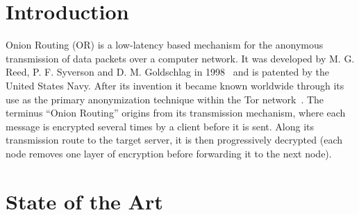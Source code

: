 \documentclass{sig-alternate}
\begin{document}


\section{Introduction}
Onion Routing (OR) is a low-latency based mechanism for the anonymous transmission of data packets over a computer network. It was developed by M. G. Reed, P. F. Syverson and D. M. Goldschlag in 1998~\cite{reed1998anonymous} and is patented by the United States Navy. After its invention it became known worldwide through its use as the primary anonymization technique within the Tor network~\cite{tor}. The terminus ``Onion Routing'' origins from its transmission mechanism, where each message is encrypted several times by a client before it is sent. Along its transmission route to the target server, it is then progressively decrypted (each node removes one layer of encryption before forwarding it to the next node).

\section{State of the Art}
\end{document}
